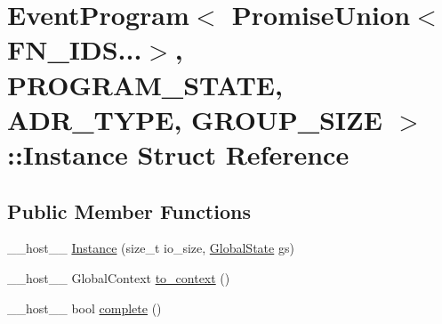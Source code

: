 \hypertarget{structEventProgram_3_01PromiseUnion_3_01FN__IDS_8_8_8_4_00	PROGRAM__STATE_00	ADR__TYPE_00	GROUP__SIZE_01_4_1_1Instance}{\section{Event\-Program$<$ Promise\-Union$<$ F\-N\-\_\-\-I\-D\-S...$>$, P\-R\-O\-G\-R\-A\-M\-\_\-\-S\-T\-A\-T\-E, A\-D\-R\-\_\-\-T\-Y\-P\-E, G\-R\-O\-U\-P\-\_\-\-S\-I\-Z\-E $>$\-:\-:Instance Struct Reference}
\label{structEventProgram_3_01PromiseUnion_3_01FN__IDS_8_8_8_4_00	PROGRAM__STATE_00	ADR__TYPE_00	GROUP__SIZE_01_4_1_1Instance}
}
\subsection*{Public Member Functions}
\begin{DoxyCompactItemize}
\item 
\-\_\-\-\_\-host\-\_\-\-\_\- \hyperlink{structEventProgram_3_01PromiseUnion_3_01FN__IDS_8_8_8_4_00	PROGRAM__STATE_00	ADR__TYPE_00	GROUP__SIZE_01_4_1_1Instance_a0ac6d01ee56c9b5c0e5c6a0e6d834435}{Instance} (size\-\_\-t io\-\_\-size, \hyperlink{structEventProgram_3_01PromiseUnion_3_01FN__IDS_8_8_8_4_00	PROGRAM__STATE_00	ADR__TYPE_00	GROUP__SIZE_01_4_a6686ae41c222fa163dbe5a3a53983186}{Global\-State} gs)
\item 
\-\_\-\-\_\-host\-\_\-\-\_\- Global\-Context \hyperlink{structEventProgram_3_01PromiseUnion_3_01FN__IDS_8_8_8_4_00	PROGRAM__STATE_00	ADR__TYPE_00	GROUP__SIZE_01_4_1_1Instance_a4fc75016806a61bf14ccacc61657e54e}{to\-\_\-context} ()
\item 
\-\_\-\-\_\-host\-\_\-\-\_\- bool \hyperlink{structEventProgram_3_01PromiseUnion_3_01FN__IDS_8_8_8_4_00	PROGRAM__STATE_00	ADR__TYPE_00	GROUP__SIZE_01_4_1_1Instance_a1e5510a396406459675c6c02f6725f8e}{complete} ()
\end{DoxyCompactItemize}
